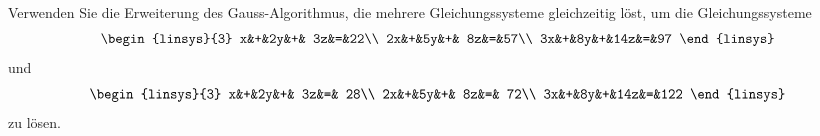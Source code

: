 Verwenden Sie die Erweiterung des Gauss-Algorithmus, die mehrere 
Gleichungssysteme gleichzeitig löst, um die Gleichungssysteme
\begin{equation}
\begin{linsys}{3}
 x&+&2y&+& 3z&=&22\\
2x&+&5y&+& 8z&=&57\\
3x&+&8y&+&14z&=&97
\end{linsys}
\end{equation}
und
\begin{equation}
\begin{linsys}{3}
 x&+&2y&+& 3z&=& 28\\
2x&+&5y&+& 8z&=& 72\\
3x&+&8y&+&14z&=&122
\end{linsys}
\end{equation}
zu lösen.


